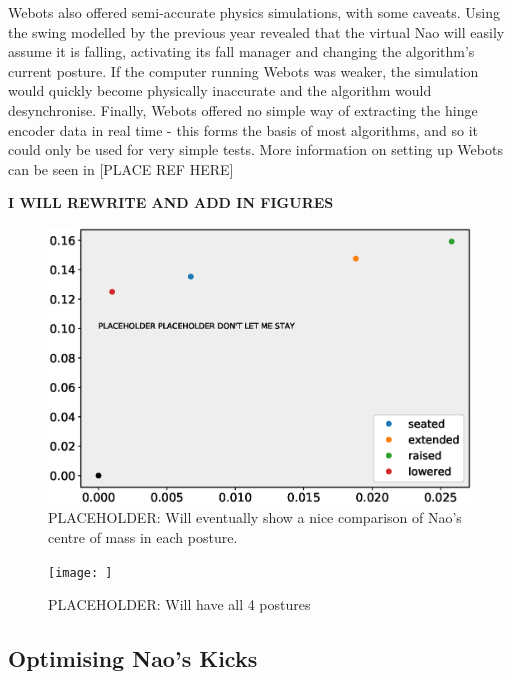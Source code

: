 \documentclass[11pt]{article}
\newcommand*\ruleline[1]{\par\noindent\raisebox{.8ex}{\makebox[\linewidth]{\hrulefill\hspace{1ex}\raisebox{-.8ex}{#1}\hspace{1ex}\hrulefill}}}
\begin{document}
Webots also offered semi-accurate physics simulations, with some caveats. Using the swing modelled by the previous year revealed that the virtual Nao will easily assume it is falling, activating its fall manager and changing the algorithm's current posture. If the computer running Webots was weaker, the simulation would quickly become physically inaccurate and the algorithm would desynchronise. Finally, Webots offered no simple way of extracting the hinge encoder data in real time - this forms the basis of most algorithms, and so it could only be used for very simple tests. More information on setting up Webots can be seen in [PLACE REF HERE]

\textbf{I WILL REWRITE AND ADD IN FIGURES}

\begin{figure}
    \centering
    \includegraphics[width=0.6\linewidth]{COMPLACEHOLDER.eps}
    \caption{PLACEHOLDER: Will eventually show a nice comparison of Nao's centre of mass in each posture.}
    \label{fig:centreofmasses}
\end{figure}

\begin{figure}
    \centering
    \texttt{[image: ]}
    \caption{PLACEHOLDER: Will have all 4 postures}
    \label{fig:postures}
\end{figure}




\subsection{Optimising Nao's Kicks}
\ruleline{David Thomas}
\end{document}
